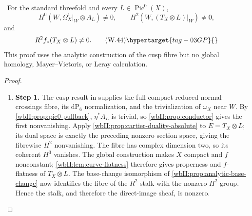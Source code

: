 \begin{corollary}
\hypertarget{tag-03DS}{}\label{wbII:cor:candidate-pic0-route}

\ For the standard threefold and every
$L\in\operatorname{Pic}^0(X)$,
\[
 H^0(W,\Omega_X^1|_W\otimes A_L)\ne0,
 \qquad
 H^2(W,(T_X\otimes L)|_W)\ne0,
\]
and
\[
 R^2f_*(T_X\otimes L)\ne0.
\tag{W.44}\hypertarget{tag-03GP}{}\label{wbII:eq:W:5.17f}
\]
This proof uses the analytic construction of the cusp fibre but no global
homology, Mayer--Vietoris, or Leray calculation.
\end{corollary}



\begin{proof}
\begin{enumerate}[label={$\langle1\rangle$\arabic*.},leftmargin=*]
\item 
\noindent\textbf{Step 1.} The cusp result in  supplies the full compact
reduced normal-crossings fibre, its $\mathrm{dP}_6$ normalization, and the
trivialization of $\omega_X$ near $W$.  By
\cref{wbII:prop:pic0-pullback}, $\eta^*A_L$ is trivial, so
\cref{wbII:prop:conductor} gives the first nonvanishing.  Apply
\cref{wbII:prop:cartier-duality-absolute} to $E=T_X\otimes L$; its dual space is
exactly the preceding nonzero section space, giving the fibrewise $H^2$
nonvanishing.  The fibre has complex dimension two, so its coherent
$H^3$ vanishes.  The global construction makes $X$ compact and $f$
nonconstant; \cref{wbII:lem:curve-flatness} therefore gives properness and
$f$-flatness of $T_X\otimes L$.  The base-change isomorphism of
\cref{wbII:prop:analytic-base-change} now identifies the fibre of the $R^2$
stalk with the nonzero $H^2$ group.  Hence the stalk, and therefore the
direct-image sheaf, is nonzero.

\end{enumerate}
\end{proof}